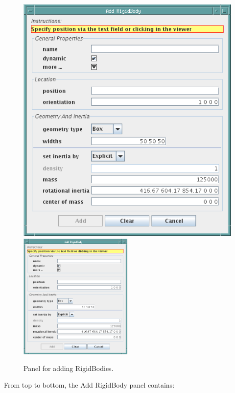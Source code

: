 \documentclass{article}
\begin{document}
\begin{figure}
\begin{center}
\iflatexml
\includegraphics[]{images/addRigidBodyPanel}
\else
\includegraphics[width=0.50\textwidth]{images/addRigidBodyPanel}
\fi
\end{center}
\caption{Panel for adding RigidBodies.}%
\label{addRigidBodyPanelFig}
\end{figure}

From top to bottom, the {\sf Add RigidBody} panel contains:
\end{document}
